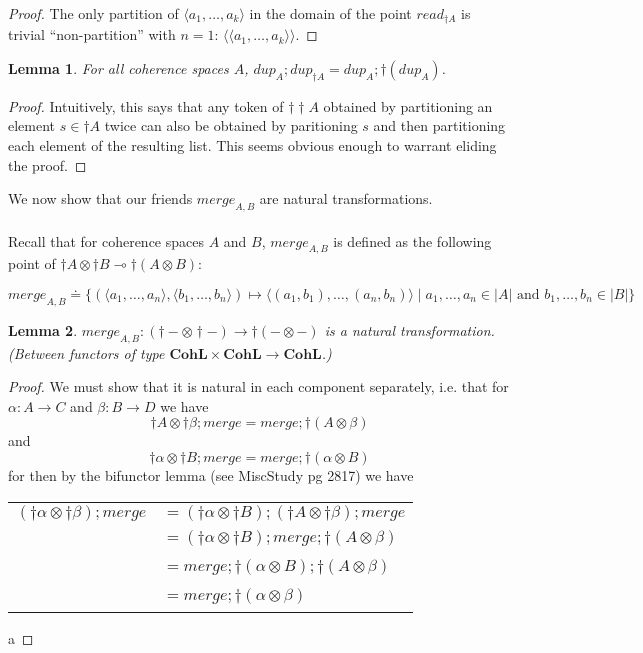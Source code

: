 \documentclass{article}
\newtheorem{lemma}{Lemma}
\newcommand{\mbf}{\mathbf}
\begin{document}
\begin{proof}
The only partition of $\langle a_1, \ldots, a_k \rangle$ in the domain of the point $\mathit{read}_{\dagger A}$ is trivial ``non-partition'' with $n=1$: $\langle \langle a_1, \ldots, a_k \rangle \rangle$. 
\end{proof}

\begin{lemma}
For all coherence spaces $A$, $\mathit{dup}_A;\mathit{dup}_{\dagger A} = \mathit{dup}_A;\dagger(\mathit{dup}_A)$.
\end{lemma}

\begin{proof}
Intuitively, this says that any token of $\dagger \dagger A$ obtained by partitioning an element $s \in \dagger A$
twice can also be obtained by paritioning $s$ and then partitioning each element of the resulting list. This 
seems obvious enough to warrant eliding the proof.
\end{proof}

We now show that our friends $\mathit{merge}_{A,B}$ are natural transformations.\\~\\
Recall that for coherence spaces $A$ and $B$, $\mathit{merge}_{A,B}$ is defined as the following point of $\dagger A \otimes \dagger B \multimap \dagger(A \otimes B)$:
 
$$\mathit{merge}_{A,B} \doteq \{ (\langle a_1, \ldots, a_n \rangle, \langle b_1, \ldots, b_n \rangle) \mapsto 
 \langle (a_1, b_1),\ldots,(a_n,b_n) \rangle \mid a_1, \ldots, a_n \in |A| \text{ and } b_1, \ldots, b_n \in |B|  \}$$

\begin{lemma}
$\mathit{merge}_{A,B} : (\dagger - \otimes \dagger -) \to \dagger(- \otimes -)$ is a natural transformation. (Between functors of type $\mbf{CohL} \times \mbf{CohL} \to \mbf{CohL}$.)
\end{lemma}

\begin{proof}
We must show that it is natural in each component separately, i.e. that for $\alpha : A \to C$ and $\beta : B \to D$ we have $$\dagger A \otimes \dagger \beta;\mathit{merge} = \mathit{merge};\dagger(A \otimes \beta)$$
and $$\dagger \alpha \otimes \dagger B;\mathit{merge} = \mathit{merge};\dagger(\alpha \otimes B)$$
for then by the bifunctor lemma (see MiscStudy pg 2817) we have~\\

\begin{tabular}{ll}
$(\dagger \alpha \otimes \dagger \beta);\mathit{merge}$ & $= (\dagger \alpha \otimes \dagger B);(\dagger A \otimes \dagger \beta);\mathit{merge}$ \\
 ~ & $= (\dagger \alpha \otimes \dagger B);\mathit{merge};\dagger(A \otimes \beta)$ \\
 ~ & $= \mathit{merge};\dagger(\alpha \otimes B);\dagger(A \otimes \beta)$ \\
 ~ & $= \mathit{merge};\dagger(\alpha \otimes \beta)$
\end{tabular}

a
\end{proof}
\end{document}
